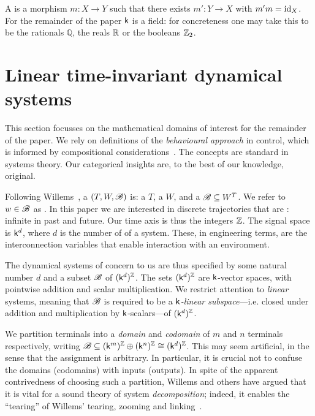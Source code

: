A  is a morphism $m\colon X\to Y$ such that there exists
$m'\colon Y\to X$ with $m'm=\mathrm{id}_X$. 
For the remainder of the paper $\mathsf{k}$ is a field: for concreteness one may take
this to be the rationals $\mathbb{Q}$, the reals ${\mathbb{R}}$ or the booleans ${\mathbb Z}_2$. 

\section{Linear time-invariant dynamical systems} \label{sec.systems}

This section focusses on the mathematical domains of interest for the remainder
of the paper. We rely on definitions of the \emph{behavioural approach} in
control, which is informed by compositional considerations~\cite{Wi}. The
concepts are standard in systems theory. Our categorical insights are, to the
best of our knowledge, original.

Following Willems~\cite{Wi3}, a  $(T, W,{\mathscr B})$ is: a
 $T$, a  $W$, and a 
${\mathscr B} \subseteq W^T$. We refer to $w \in {\mathscr B}$ as . 
%
In this paper we are interested in discrete trajectories that are
: infinite in past and future.  Our time axis is thus the
integers ${\mathbb Z}$. The signal space is $\mathsf{k}^d$, where $d$ is the number of
 of a system. These, in engineering terms, are the
interconnection variables that enable interaction with an environment.

The dynamical systems of concern to us are thus specified by some natural number
$d$ and a subset ${\mathscr B}$ of $(\mathsf{k}^d)^{\mathbb Z}$. The sets $(\mathsf{k}^d)^{\mathbb Z}$ are $\mathsf{k}$-vector
spaces, with pointwise addition and scalar multiplication. We restrict attention
to \emph{linear} systems, meaning that ${\mathscr B}$ is required to be a \emph{$\mathsf{k}$-linear subspace}---i.e.
closed under addition and multiplication by $\mathsf{k}$-scalars---of
$(\mathsf{k}^d)^{\mathbb Z}$. 

We partition terminals into a \emph{domain} and \emph{codomain} of $m$ and $n$
terminals respectively, writing ${\mathscr B} \subseteq (\mathsf{k}^m)^{\mathbb Z} \oplus (\mathsf{k}^n)^{\mathbb Z} \cong
(\mathsf{k}^d)^{\mathbb Z}$.  This may seem artificial, in the sense that the assignment is
arbitrary.  In particular, it is crucial not to confuse the domains (codomains)
with inputs (outputs). In spite of the apparent contrivedness of choosing such a
partition, Willems and others have argued that it is vital for a sound theory of
system \emph{decomposition}; indeed, it enables the ``tearing'' of Willems'
tearing, zooming and linking~\cite{Wi}.

